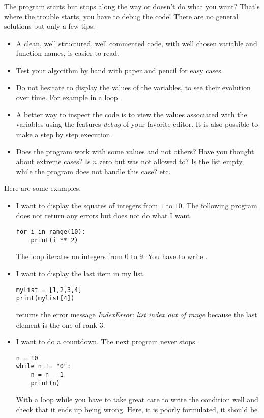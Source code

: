 \documentclass[11pt,class=report,crop=false]{standalone}
\begin{document}
The program starts but stops along the way or doesn't do what you want? That's where the trouble starts, you have to debug the code!  There are no general solutions but only a few tips:
\begin{itemize}
  \item A clean, well structured, well commented code, with well chosen variable and function names, is easier to read.

  \item Test your algorithm by hand with paper and pencil for easy cases.

  \item Do not hesitate to display the values of the variables, to see their evolution over time. For example  in a loop. 
  
  \item A better way to inspect the code is to view the values associated with the variables using the features \emph{debug} of your favorite \Python{} editor. It is also possible to make a step by step execution.

  \item Does the program work with some values and not others? Have you thought about extreme cases? Is $n$ zero but was not allowed to? Is the list empty, while the program does not handle this case? etc.
\end{itemize}

 \medskip
 
Here are some examples.

\begin{itemize}
  \item I want to display the squares of integers from $1$ to $10$. The following program does not return any errors but does not do what I want.
\begin{lstlisting}
for i in range(10):
    print(i ** 2)
\end{lstlisting}
The loop iterates on integers from $0$ to $9$. You have to write .

  \item I want to display the last item in my list.
\begin{lstlisting}     
mylist = [1,2,3,4]
print(mylist[4])
\end{lstlisting}  
\Python{} returns the error message \emph{IndexError: list index out of range} because the last element is the one of rank $3$.


  \item I want to do a countdown. The next program never stops.
\begin{lstlisting}   
n = 10
while n != "0":
    n = n - 1
    print(n)
\end{lstlisting} 
With a loop \og{}while\fg{} you have to take great care to write the condition well and check that it ends up being wrong. Here, it is poorly formulated, it should be 


\end{itemize}
\end{document}
